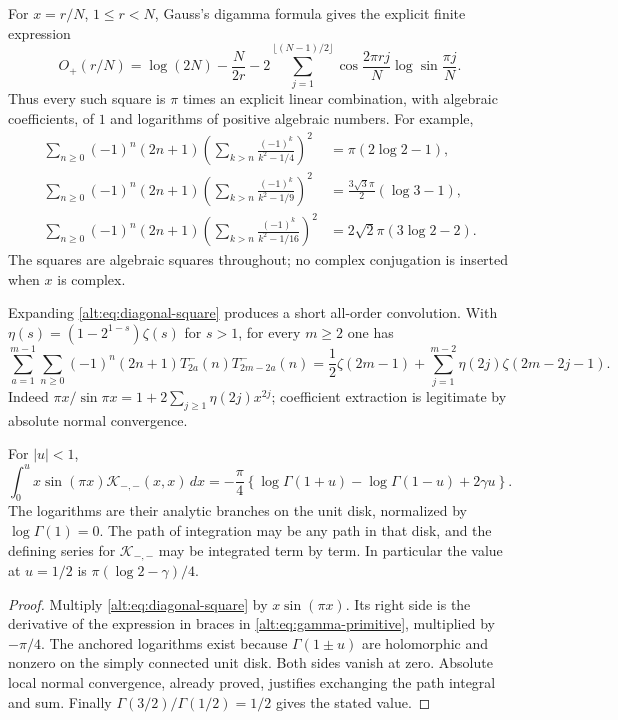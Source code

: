 For $x=r/N$, $1\le r<N$, Gauss's digamma formula
\cite[Eq.~(5.4.19)]{DLMFGamma} gives the explicit
finite expression
\begin{equation}\label{alt:eq:rational-O}
 O_+(r/N)=\log(2N)-\frac{N}{2r}
 -2\sum_{j=1}^{\lfloor(N-1)/2\rfloor}
       \cos\frac{2\pi rj}{N}\log\sin\frac{\pi j}{N}.
\end{equation}
Thus every such square is $\pi$ times an explicit linear combination,
with algebraic coefficients, of $1$ and logarithms of positive
algebraic numbers. For example,
\begin{align}
 \sum_{n\ge0}(-1)^n(2n+1)
  \left(\sum_{k>n}\frac{(-1)^k}{k^2-1/4}\right)^2
 &=\pi(2\log2-1),\label{alt:eq:half-example}\\
 \sum_{n\ge0}(-1)^n(2n+1)
  \left(\sum_{k>n}\frac{(-1)^k}{k^2-1/9}\right)^2
 &=\frac{3\sqrt3\pi}{2}(\log3-1),\label{alt:eq:third-example}\\
 \sum_{n\ge0}(-1)^n(2n+1)
  \left(\sum_{k>n}\frac{(-1)^k}{k^2-1/16}\right)^2
 &=2\sqrt2\pi(3\log2-2).\label{alt:eq:quarter-example}
\end{align}
The squares are algebraic squares throughout; no complex conjugation
is inserted when $x$ is complex.

Expanding \eqref{alt:eq:diagonal-square} produces a short all-order
convolution. With $\eta(s)=(1-2^{1-s})\zeta(s)$ for $s>1$, for every
$m\ge2$ one has
\begin{equation}\label{alt:eq:convolution}
 \sum_{a=1}^{m-1}\sum_{n\ge0}(-1)^n(2n+1)
        T_{2a}^-(n)T_{2m-2a}^-(n)
 =\frac12\zeta(2m-1)
   +\sum_{j=1}^{m-2}\eta(2j)\zeta(2m-2j-1).
\end{equation}
Indeed
$\pi x/\sin\pi x=1+2\sum_{j\ge1}\eta(2j)x^{2j}$;
coefficient extraction is legitimate by absolute normal convergence.

\begin{corollary}
\label{alt:cor:gamma-primitive}
For $|u|<1$,
\begin{equation}\label{alt:eq:gamma-primitive}
 \int_0^u x\sin(\pi x)\mathcal K_{-,-}(x,x)\,dx
 =-\frac\pi4\left\{
 \log\Gamma(1+u)-\log\Gamma(1-u)+2\gamma u\right\}.
\end{equation}
The logarithms are their analytic branches on the unit disk,
normalized by $\log\Gamma(1)=0$. The path of integration may be any
path in that disk, and the defining series for $\mathcal K_{-,-}$
may be integrated term by term. In particular the value at $u=1/2$
is $\pi(\log2-\gamma)/4$.
\end{corollary}
\begin{proof}
Multiply \eqref{alt:eq:diagonal-square} by $x\sin(\pi x)$.
Its right side is the derivative of the expression in braces
in \eqref{alt:eq:gamma-primitive}, multiplied by $-\pi/4$.
The anchored logarithms exist because $\Gamma(1\pm u)$ are
holomorphic and nonzero on the simply connected unit disk.
Both sides vanish at zero. Absolute local normal convergence,
already proved, justifies exchanging the path integral and sum.
Finally $\Gamma(3/2)/\Gamma(1/2)=1/2$ gives the stated value.
\end{proof}


